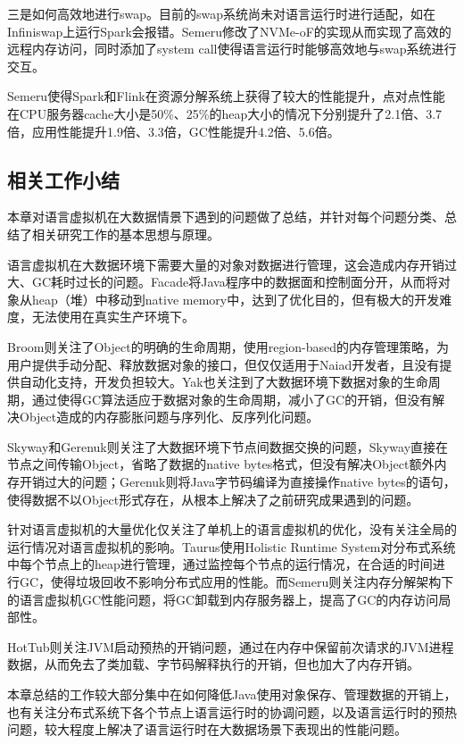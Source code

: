 \documentclass[lang=cn,12pt,a4paper,cite=authoryear]{elegantpaper}
\begin{document}
三是如何高效地进行swap。目前的swap系统尚未对语言运行时进行适配，如在Infiniswap\cite{DBLP:conf/nsdi/GuLZCS17}上运行Spark会报错。Semeru修改了NVMe-oF的实现从而实现了高效的远程内存访问，同时添加了system call使得语言运行时能够高效地与swap系统进行交互。

Semeru使得Spark和Flink在资源分解系统上获得了较大的性能提升，点对点性能在CPU服务器cache大小是50\%、25\%的heap大小的情况下分别提升了2.1倍、3.7倍，应用性能提升1.9倍、3.3倍，GC性能提升4.2倍、5.6倍。

\subsection{相关工作小结}
本章对语言虚拟机在大数据情景下遇到的问题做了总结，并针对每个问题分类、总结了相关研究工作的基本思想与原理。

语言虚拟机在大数据环境下需要大量的对象对数据进行管理，这会造成内存开销过大、GC耗时过长的问题。Facade将Java程序中的数据面和控制面分开，从而将对象从heap（堆）中移动到native memory中，达到了优化目的，但有极大的开发难度，无法使用在真实生产环境下。

Broom则关注了Object的明确的生命周期，使用region-based的内存管理策略，为用户提供手动分配、释放数据对象的接口，但仅仅适用于Naiad开发者，且没有提供自动化支持，开发负担较大。Yak\cite{DBLP:conf/osdi/NguyenFXDLAM16}也关注到了大数据环境下数据对象的生命周期，通过使得GC算法适应于数据对象的生命周期，减小了GC的开销，但没有解决Object造成的内存膨胀问题与序列化、反序列化问题。

Skyway和Gerenuk则关注了大数据环境下节点间数据交换的问题，Skyway直接在节点之间传输Object，省略了数据的native bytes格式，但没有解决Object额外内存开销过大的问题；Gerenuk则将Java字节码编译为直接操作native bytes的语句，使得数据不以Object形式存在，从根本上解决了之前研究成果遇到的问题。

针对语言虚拟机的大量优化仅关注了单机上的语言虚拟机的优化，没有关注全局的运行情况对语言虚拟机的影响。Taurus使用Holistic Runtime System对分布式系统中每个节点上的heap进行管理，通过监控每个节点的运行情况，在合适的时间进行GC，使得垃圾回收不影响分布式应用的性能。而Semeru则关注内存分解架构下的语言虚拟机GC性能问题，将GC卸载到内存服务器上，提高了GC的内存访问局部性。

HotTub则关注JVM启动预热的开销问题，通过在内存中保留前次请求的JVM进程数据，从而免去了类加载、字节码解释执行的开销，但也加大了内存开销。

本章总结的工作较大部分集中在如何降低Java使用对象保存、管理数据的开销上，也有关注分布式系统下各个节点上语言运行时的协调问题，以及语言运行时的预热问题，较大程度上解决了语言运行时在大数据场景下表现出的性能问题。
\end{document}
